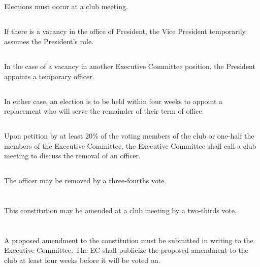 \documentclass{bylaws}
\begin{document}
\subsection{}Elections must occur at a club meeting.

\subsection{}If there is a vacancy in the office of President, the Vice President temporarily assumes the President's role.
\subsection{}In the case of a vacancy in another Executive Committee position, the President appoints a temporary officer.
\subsection{}In either case, an election is to be held within four weeks to appoint a replacement who will serve the remainder of their term of office.

\subsection{}Upon petition by at least 20\% of the voting members of the club or one-half the members of the Executive Committee, the Executive Committee shall call a club meeting to discuss the removal of an officer.
\subsection{}The officer may be removed by a three-fourths vote.


\section{}This constitution may be amended at a club meeting by a two-thirds vote.
\section{}A proposed amendment to the constitution must be submitted in writing to the Executive Committee. The EC shall publicize the proposed amendment to the club at least four weeks before it will be voted on.
\end{document}
